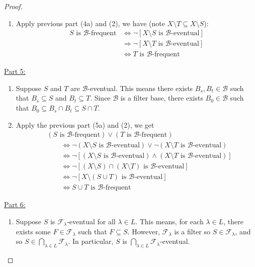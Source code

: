 \documentclass{treatise}
\begin{document}
\begin{proof}
\begin{enumerate}[label=(\alph*)]
    \item Apply previous part (4a) and (2), we have (note $X \setminus T \subseteq X \setminus S$):
    \begin{align*}
        S \mbox{ is } \mathcal{B} \mbox{-frequent} & \Leftrightarrow \neg [X \setminus S \mbox{ is } \mathcal{B} \mbox{-eventual}]
        \\
        & \Rightarrow \neg [X \setminus T \mbox{ is } \mathcal{B} \mbox{-eventual}]
        \\
        & \Leftrightarrow T \mbox{ is } \mathcal{B} \mbox{-frequent}
    \end{align*}
\end{enumerate}
\underline{Part 5:}
\begin{enumerate}[label=(\alph*)]
    \item Suppose $S$ and $T$ are $\mathcal{B}$-eventual. This means there exists $B_s, B_t \in \mathcal{B}$ such that $B_s \subseteq S$ and $B_t \subseteq T$. Since $\mathcal{B}$ is a filter base, there exists $B_0 \in \mathcal{B}$ such that $B_0 \subseteq B_s \cap B_t \subseteq S \cap T$.
    \item Apply the previous part (5a) and (2), we get
    \begin{align*}
        & (S \mbox{ is } \mathcal{B} \mbox{-frequent}) \vee (T \mbox{ is } \mathcal{B} \mbox{-frequent})
        \\
        & \qquad \Leftrightarrow \neg (X \setminus S \mbox{ is } \mathcal{B} \mbox{-eventual}) \vee \neg (X \setminus T \mbox{ is } \mathcal{B} \mbox{-eventual})
        \\
        & \qquad \Leftrightarrow \neg [(X \setminus S \mbox{ is } \mathcal{B} \mbox{-eventual}) \wedge (X \setminus T \mbox{ is } \mathcal{B} \mbox{-eventual})]
        \\
        & \qquad \Leftrightarrow \neg [(X \setminus S) \cap (X \setminus T) \mbox{ is } \mathcal{B} \mbox{-eventual}]
        \\
        & \qquad \Leftrightarrow \neg [X \setminus (S \cup T) \mbox{ is } \mathcal{B} \mbox{-eventual}]
        \\
        & \qquad \Leftrightarrow S \cup T \mbox{ is } \mathcal{B} \mbox{-frequent}
    \end{align*}
\end{enumerate}
\underline{Part 6:}
\begin{enumerate}[label=(\alph*)]
    \item Suppose $S$ is $\mathcal{F}_\lambda$-eventual for all $\lambda \in L$. This means, for each $\lambda \in L$, there exists some $F \in \mathcal{F}_\lambda$ such that $F \subseteq S$. However, $\mathcal{F}_\lambda$ is a filter so $S \in \mathcal{F}_\lambda$, and so $S \in \bigcap_{\lambda \in L} \mathcal{F}_\lambda$. In particular, $S$ is $\bigcap_{\lambda \in L} \mathcal{F}_\lambda$-eventual.

\end{enumerate}
\end{proof}
\end{document}

